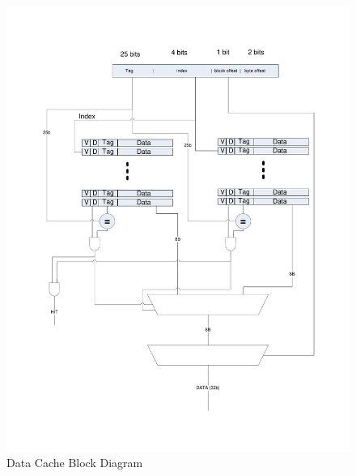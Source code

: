 \documentclass[12pt]{article}
\begin{document}
\begin{figure}
	\begin{center}
		\includegraphics[width=7in]{dcache2}
	\end{center}
	\caption{Data Cache Block Diagram}
	\label{fig:dcache}
\end{figure}


\newpage
\end{document}
